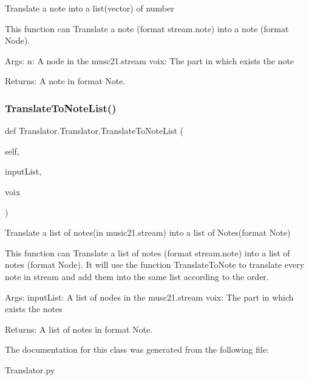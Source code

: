 \begin{DoxyVerb}Translate a note into a list(vector) of number

This function can Translate a note (format stream.note) into a note (format
Node).

Args:
    n: A node in the musc21.stream
    voix: The part in which exists the note

Returns:
    A note in format Note.
\end{DoxyVerb}
 \mbox{\label{class_translator_1_1_translator_a20b6862fd7e26a69c6eb22fa784b7fe7}} 
\subsubsection{\texorpdfstring{Translate\+To\+Note\+List()}{TranslateToNoteList()}}
{\footnotesize\ttfamily def Translator.\+Translator.\+Translate\+To\+Note\+List (\begin{DoxyParamCaption}\item[{}]{self,  }\item[{}]{input\+List,  }\item[{}]{voix }\end{DoxyParamCaption})}

\begin{DoxyVerb}Translate a list of notes(in music21.stream) into a list of Notes(format
Note)

This function can Translate a list of notes (format stream.note) into a list
of notes (format Node). It will use the function TranslateToNote to translate
every note in stream and add them into the same list according to the order.

Args:
    inputList: A list of nodes in the musc21.stream
    voix: The part in which exists the notes

Returns:
    A list of notes in format Note.
\end{DoxyVerb}
 

The documentation for this class was generated from the following file\+:\begin{DoxyCompactItemize}
\item 
Translator.\+py\end{DoxyCompactItemize}
